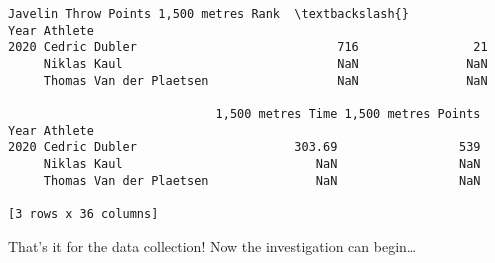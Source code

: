 \documentclass[11pt]{article}
\begin{document}
\begin{Verbatim}[commandchars=\\\{\}]
                             Javelin Throw Points 1,500 metres Rank  \textbackslash{}
Year Athlete                                                          
2020 Cedric Dubler                            716                21   
     Niklas Kaul                              NaN               NaN   
     Thomas Van der Plaetsen                  NaN               NaN   

                             1,500 metres Time 1,500 metres Points  
Year Athlete                                                        
2020 Cedric Dubler                      303.69                 539  
     Niklas Kaul                           NaN                 NaN  
     Thomas Van der Plaetsen               NaN                 NaN  

[3 rows x 36 columns]
    \end{Verbatim}

    
    That's it for the data collection! Now the investigation can
begin\ldots{}
    
    
    
\end{document}
